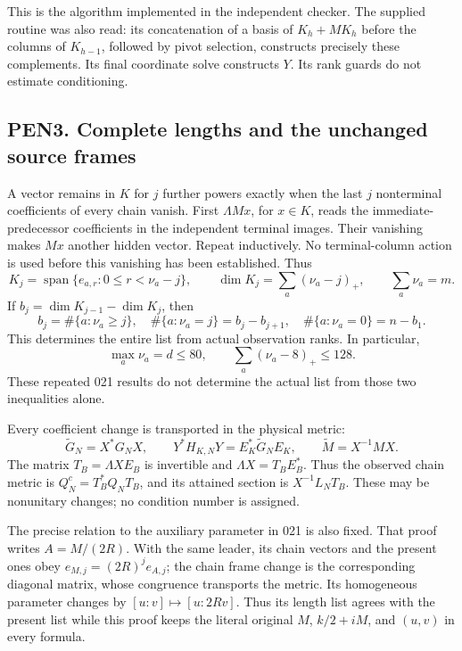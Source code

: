 \documentclass[11pt]{article}
\begin{document}
This is the algorithm implemented in the independent checker. The supplied routine was also read: its concatenation of a basis of \(K_h+MK_h\) before the columns of \(K_{h-1}\), followed by pivot selection, constructs precisely these complements. Its final coordinate solve constructs \(Y\). Its rank guards do not estimate conditioning.

\subsection{PEN3. Complete lengths and the unchanged source frames}\label{pen3.-complete-lengths-and-the-unchanged-source-frames}

A vector remains in \(K\) for \(j\) further powers exactly when the last \(j\) nonterminal coefficients of every chain vanish. First \(\Lambda Mx\), for \(x\in K\), reads the immediate-predecessor coefficients in the independent terminal images. Their vanishing makes \(Mx\) another hidden vector. Repeat inductively. No terminal-column action is used before this vanishing has been established. Thus \[
K_j=\operatorname{span}\{e_{a,r}:0\le r<\nu_a-j\},\qquad
\dim K_j=\sum_a(\nu_a-j)_+,\qquad \sum_a\nu_a=m. \tag{PEN5}
\] If \(b_j=\dim K_{j-1}-\dim K_j\), then \[
b_j=\#\{a:\nu_a\ge j\},\quad
\#\{a:\nu_a=j\}=b_j-b_{j+1},\quad
\#\{a:\nu_a=0\}=n-b_1.
\] This determines the entire list from actual observation ranks. In particular, \[
\max_a\nu_a=d\le80,\qquad
\sum_a(\nu_a-8)_+\le128.
\] These repeated 021 results do not determine the actual list from those two inequalities alone.

Every coefficient change is transported in the physical metric: \[
\widetilde G_N=X^*G_NX,\qquad
Y^*H_{K,N}Y=E_K^*\widetilde G_NE_K,\qquad
\widetilde M=X^{-1}MX.
\] The matrix \(T_B=\Lambda XE_B\) is invertible and \(\Lambda X=T_BE_B^*\). Thus the observed chain metric is \(Q_N^c=T_B^*Q_NT_B\), and its attained section is \(X^{-1}L_NT_B\). These may be nonunitary changes; no condition number is assigned.

The precise relation to the auxiliary parameter in 021 is also fixed. That proof writes \(A=M/(2R)\). With the same leader, its chain vectors and the present ones obey \(e_{M,j}=(2R)^je_{A,j}\); the chain frame change is the corresponding diagonal matrix, whose congruence transports the metric. Its homogeneous parameter changes by \([u:v]\mapsto[u:2Rv]\). Thus its length list agrees with the present list while this proof keeps the literal original \(M\), \(k/2+iM\), and \((u,v)\) in every formula.
\end{document}
